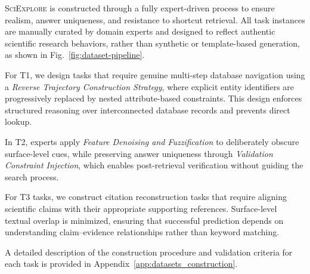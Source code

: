 \textsc{SciExplore} is constructed through a fully expert-driven process to ensure realism, answer uniqueness, and resistance to shortcut retrieval.
All task instances are manually curated by domain experts and designed to reflect authentic scientific research behaviors, rather than synthetic or template-based generation, as shown in Fig.~\ref{fig:dataset-pipeline}.

\vspace{0.5em}
 For T1, we design tasks that require genuine multi-step database navigation using a \emph{Reverse Trajectory Construction Strategy}, where explicit entity identifiers are progressively replaced by nested attribute-based constraints.
This design enforces structured reasoning over interconnected database records and prevents direct lookup.

 In T2, experts apply \emph{Feature Denoising and Fuzzification} to deliberately obscure surface-level cues, while preserving answer uniqueness through \emph{Validation Constraint Injection}, which enables post-retrieval verification without guiding the search process.

 For T3 tasks, we construct citation reconstruction tasks that require aligning scientific claims with their appropriate supporting references.
Surface-level textual overlap is minimized, ensuring that successful prediction depends on understanding claim–evidence relationships rather than keyword matching.


A detailed description of the construction procedure and validation criteria for each task is provided in Appendix~\ref{app:datasets_construction}.



